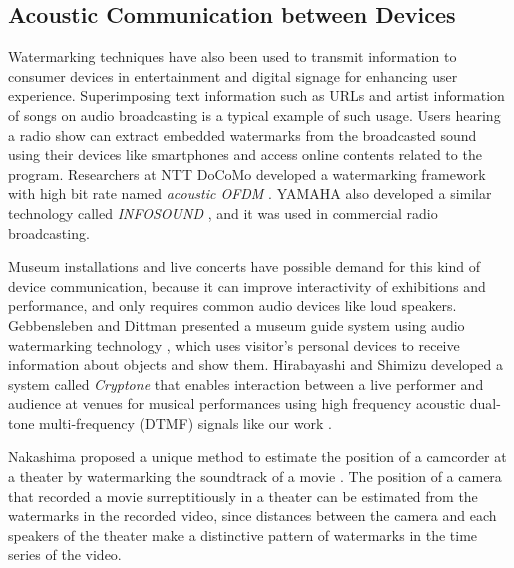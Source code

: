\subsection{Acoustic Communication between Devices}
Watermarking techniques have also been used to transmit information to consumer devices in entertainment and digital signage for enhancing user experience.
Superimposing text information such as URLs and artist information of songs on audio broadcasting is a typical example of such usage.
Users hearing a radio show can extract embedded watermarks from the broadcasted sound using their devices like smartphones and access online contents related to the program.
Researchers at NTT DoCoMo developed a watermarking framework with high bit rate named {\it acoustic OFDM} \cite{matsuoka2008acoustic}. YAMAHA also developed a similar technology called {\it INFOSOUND} \cite{infosound}, and it was used in commercial radio broadcasting.

Museum installations and live concerts have possible demand for this kind of device communication, because it can improve interactivity of exhibitions and performance, and only requires common audio devices like loud speakers.
Gebbensleben and Dittman presented a museum guide system using audio watermarking technology \cite{gebbensleben2006multimodal}, which uses visitor's personal devices to receive information about objects and show them.
Hirabayashi and Shimizu developed a system called {\it Cryptone} that enables interaction between a live performer and audience at venues for musical performances using high frequency acoustic dual-tone multi-frequency (DTMF) signals like our work \cite{Hirabayashi:2012:CIP:2407707.2407712}.

Nakashima proposed a unique method to estimate the position of a camcorder at a theater by watermarking the soundtrack of a movie \cite{nakashima2009watermarked}.
The position of a camera that recorded a movie surreptitiously in a theater can be estimated from the watermarks in the recorded video, since distances between the camera and each speakers of the theater make a distinctive pattern of watermarks in the time series of the video.

